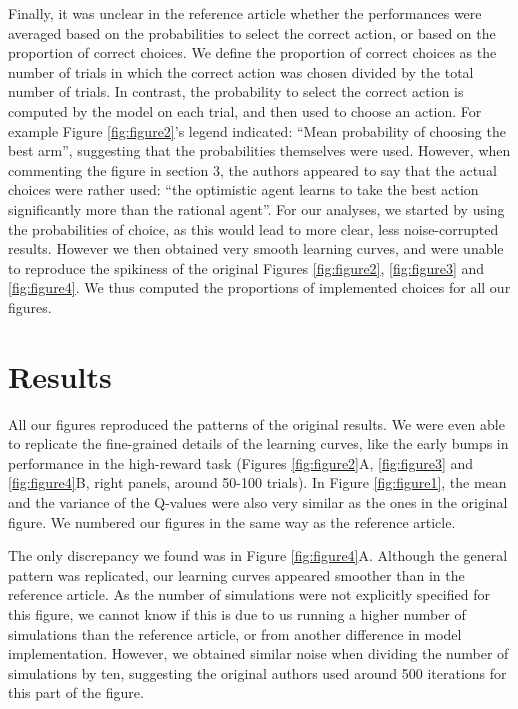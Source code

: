 \documentclass[10pt,a4paper,onecolumn]{article}
\begin{document}
Finally, it was unclear in the reference article whether the performances 
were averaged based on the probabilities to select the correct action, 
or based on the proportion of correct choices. We define the proportion 
of correct choices as the number of trials in which the correct action 
was chosen divided by the total number of trials. In contrast, the 
probability to select the correct action is computed by the model 
on each trial, and then used to choose an action. For example
Figure \ref{fig:figure2}'s legend indicated: ``Mean probability of choosing the best
arm'', suggesting that the probabilities themselves were used. However,
when commenting the figure in section 3, the authors appeared to say
that the actual choices were rather used: ``the optimistic agent learns
to take the best action significantly more than the rational agent''.
For our analyses, we started by using the probabilities of choice, as
this would lead to more clear, less noise-corrupted results. However we
then obtained very smooth learning curves, and were unable to reproduce
the spikiness of the original Figures \ref{fig:figure2}, 
\ref{fig:figure3} and \ref{fig:figure4}. We thus computed the
proportions of implemented choices for all our figures.

\hypertarget{results}{%
\section{Results}\label{results}}

All our figures reproduced the patterns of the original results. We were
even able to replicate the fine-grained details of the learning curves,
like the early bumps in performance in the high-reward task (Figures
 \ref{fig:figure2}A, \ref{fig:figure3} and \ref{fig:figure4}B, right
panels, around 50-100 trials). In Figure \ref{fig:figure1}, the mean
and the variance of the Q-values were also very similar as the ones in
the original figure. We numbered our figures in the same way as the reference article. 

The only discrepancy we found was in Figure \ref{fig:figure4}A.
Although the general pattern was replicated, our learning curves
appeared smoother than in the reference article. As the number of
simulations were not explicitly specified for this figure, we cannot
know if this is due to us running a higher number of simulations than
the reference article, or from another difference in model
implementation. However, we obtained similar noise when dividing 
the number of simulations by ten, suggesting the original authors 
used around 500 iterations for this part of the figure.
\end{document}
